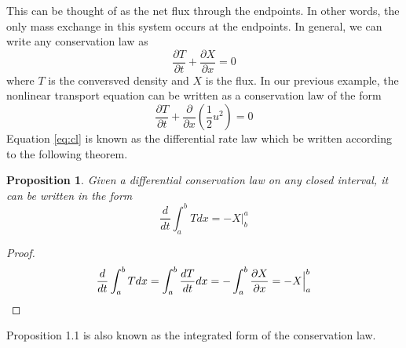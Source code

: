 \documentclass{article}
\newcommand{\pd}[2]{\frac{\partial #1}{\partial #2}}
\newcommand{\od}[2]{\frac{d #1}{d #2}}
\newtheorem{proposition}[theorem]{Proposition}
\numberwithin{equation}{section}
\begin{document}
This can be thought of as the net flux through the endpoints. In other words, the only mass exchange in this system occurs at the endpoints. In general, we can write any conservation law as 
\begin{equation}
    \pd{T}{t} + \pd{X}{x} = 0 \label{eq:cl}
\end{equation}
where $T$ is the conversved density and $X$ is the flux. In our previous example, the nonlinear transport equation can be written as a conservation law of the form
\begin{equation*}
    \pd{T}{t} +\frac{\partial}{\partial x}(\frac{1}{2}u^2)=0
\end{equation*}
Equation \eqref{eq:cl} is known as the differential rate law which be written according to the following theorem.

\begin{proposition}
    Given a differential conservation law on any closed interval, it can be written in the form
    \begin{equation}
        \frac{d}{dt}\int^b_aTdx = -X\Big|^a_b
    \end{equation}
\end{proposition}
\begin{proof} 
\begin{equation*}
    \displaystyle{\frac{d}{dt}\int^b_aTdx = \int^b_a\od{T}{t}dx=-\int^b_a\pd{X}{x}=-X\Big|^b_a}\\
\end{equation*}
\end{proof}
Proposition 1.1 is also known as the integrated form of the conservation law.\\
\end{document}
